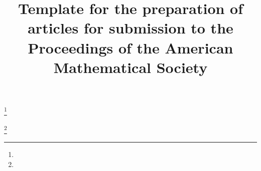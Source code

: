 \documentclass{proc-l}
\theoremstyle{definition}
\theoremstyle{remark}
\numberwithin{equation}{section}
\begin{document}
\title{Template for the preparation of articles for submission to the Proceedings of the American Mathematical Society}


\author{}
\address{}
\curraddr{}
\email{}
\thanks{}

\author{}
\address{}
\curraddr{}
\email{}
\thanks{}


\date{}

\dedicatory{}

\commby{}

\begin{abstract}
\end{abstract}

\maketitle



\end{document}
